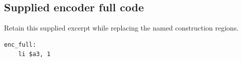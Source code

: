 \subsection*{Supplied encoder full code}
Retain this supplied excerpt while replacing the named construction regions.
\begin{verbatim}
enc_full:
    li $a3, 1
\end{verbatim}
